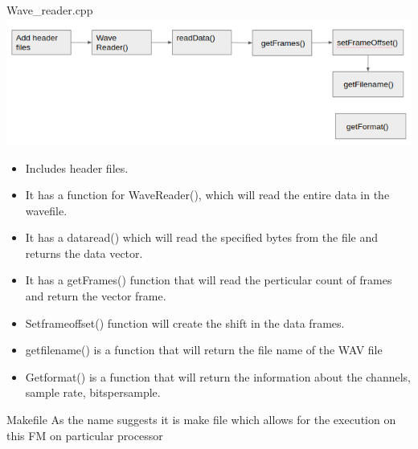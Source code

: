 \documentclass{beamer}
\begin{document}
\begin{frame}{Wave\_reader.cpp}
\includegraphics[scale=0.5]{wavereaer.png}

\begin{itemize}
\item Includes header files.
\item It has a function for WaveReader(), which will read the entire data in the wavefile.
\item It has a dataread() which will read the specified bytes from the file and returns the data vector.
\item It has a getFrames() function that will read the perticular count of frames and return the vector frame.
\item Setframeoffset() function will create the shift in the data frames.

\item getfilename() is a function that will return the file name of the WAV file

\item Getformat() is a function that will return the information about the channels, sample rate, bitspersample. 




\end{itemize}


\end{frame}



\begin{frame}{Makefile}
As the name suggests it is make file which allows for the execution on this FM on particular processor

\end{frame}
\end{document}
